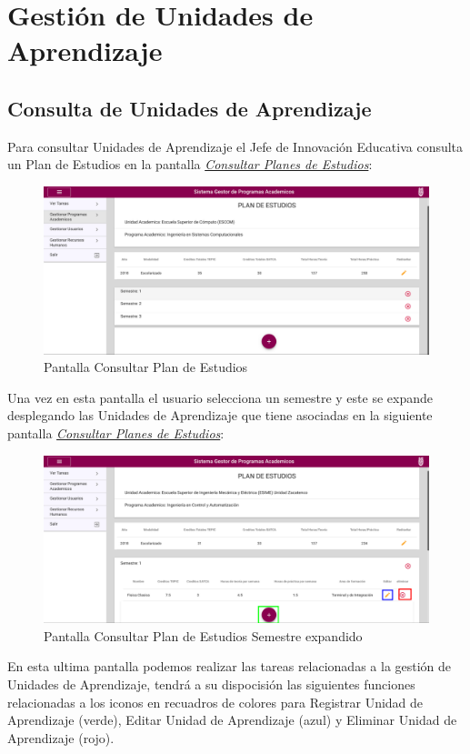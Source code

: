 \section{Gestión de Unidades de Aprendizaje}
    \subsection{Consulta de Unidades de Aprendizaje}
Para consultar Unidades de Aprendizaje el Jefe de Innovación Educativa consulta un Plan de Estudios en la pantalla \hyperlink{consultarS}{\textit{Consultar Planes de Estudios}}:\\
\begin{figure}[!hbtp]
    \centering
    \hypertarget{consultarS}{\includegraphics[width=0.7\linewidth]{images/GUA/consultarS}}
    \caption{Pantalla Consultar Plan de Estudios}
    \label{consultarS}
\end{figure}
\clearpage
Una vez en esta pantalla el usuario selecciona un semestre y este se expande desplegando las Unidades de Aprendizaje que tiene asociadas en la siguiente pantalla \hyperlink{consultarUA}{\textit{Consultar Planes de Estudios}}:\\
\begin{figure}[!hbtp]
    \centering
    \hypertarget{consultarUA}{\includegraphics[width=0.7\linewidth]{images/GUA/consultarUA}}
    \caption{Pantalla Consultar Plan de Estudios Semestre expandido}
    \label{consultarUA}
\end{figure}
En esta ultima pantalla podemos realizar las tareas relacionadas a la gestión de Unidades de Aprendizaje, tendrá a su dispocisión las siguientes funciones relacionadas a los iconos en recuadros de colores para Registrar Unidad de Aprendizaje (verde), Editar Unidad de Aprendizaje (azul) y Eliminar Unidad de Aprendizaje (rojo).
\clearpage
